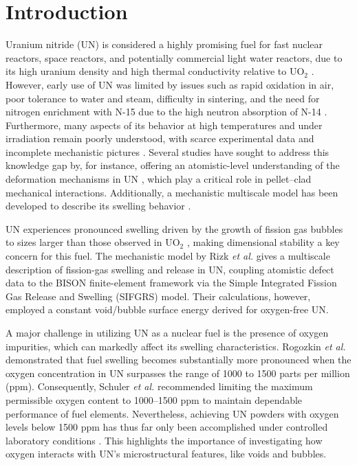 \documentclass[preprint,12pt,sort&compress]{elsarticle}
\newcommand{\?}{\stackrel{?}{=}}
\providecommand{\DIFaddtex}[1]{{\bf #1}} %
\providecommand{\DIFdeltex}[1]{} %
\providecommand{\DIFaddbegin}{\protect\color{blue}} %
\providecommand{\DIFaddend}{\protect\color{black}} %
\providecommand{\DIFdelbegin}{\protect\color{red}} %
\providecommand{\DIFdelend}{\protect\color{black}} %
\providecommand{\DIFadd}[1]{\texorpdfstring{\DIFaddtex{#1}}{#1}} %
\providecommand{\DIFdel}[1]{\texorpdfstring{\DIFdeltex{#1}}{}} %
\newcommand{\DIFscaledelfig}{0.5}
\newlength{\DIFdelgraphicswidth} %
\newlength{\DIFdelgraphicsheight} %
\newcommand{\DIFaddincludegraphics}[2][]{{\color{blue}\fbox{\DIFOincludegraphics[#1]{#2}}}} %
\newcommand{\DIFdelincludegraphics}[2][]{%
\sbox{\DIFdelgraphicsbox}{\DIFOincludegraphics[#1]{#2}}%
\settoboxwidth{\DIFdelgraphicswidth}{\DIFdelgraphicsbox} %
\settoboxtotalheight{\DIFdelgraphicsheight}{\DIFdelgraphicsbox} %
\scalebox{\DIFscaledelfig}{%
\parbox[b]{\DIFdelgraphicswidth}{\usebox{\DIFdelgraphicsbox}\\[-\baselineskip] \rule{\DIFdelgraphicswidth}{0em}}\llap{\resizebox{\DIFdelgraphicswidth}{\DIFdelgraphicsheight}{%
\setlength{\unitlength}{\DIFdelgraphicswidth}%
\begin{picture}(1,1)%
\thicklines\linethickness{2pt} %
{\color[rgb]{1,0,0}\put(0,0){\framebox(1,1){}}}%
{\color[rgb]{1,0,0}\put(0,0){\line( 1,1){1}}}%
{\color[rgb]{1,0,0}\put(0,1){\line(1,-1){1}}}%
\end{picture}%
}\hspace*{3pt}}} %
} %
\DeclareRobustCommand{\DIFaddbegin}{\DIFOaddbegin \let\includegraphics\DIFaddincludegraphics} %
\DeclareRobustCommand{\DIFaddend}{\DIFOaddend \let\includegraphics\DIFOincludegraphics} %
\DeclareRobustCommand{\DIFdelbegin}{\DIFOdelbegin \let\includegraphics\DIFdelincludegraphics} %
\DeclareRobustCommand{\DIFdelend}{\DIFOaddend \let\includegraphics\DIFOincludegraphics} %
\begin{document}
\newpage

\linenumbers

\section{Introduction}
\label{intro}

Uranium nitride (UN) is considered a highly promising fuel for fast nuclear reactors, space reactors, and potentially commercial light water reactors, due to its high uranium density and high thermal conductivity relative to UO$_2$ \cite{Wallenius2020, Uno2020}. However, early use of UN was limited by issues such as rapid oxidation in air, poor tolerance to water and steam, difficulty in sintering, and the need for nitrogen enrichment with N-15 due to the high neutron absorption of N-14 \cite{Wallenius2020, Uno2020}. Furthermore, many aspects of its behavior at high temperatures and under irradiation remain poorly understood, with scarce experimental data and incomplete mechanistic pictures \cite{Wallenius2020, Uno2020}. Several studies have sought to address this knowledge gap by, for instance, offering an atomistic-level understanding of the deformation mechanisms in UN \DIFdelbegin \DIFdel{\cite{AbdulHameed2024b, AbdulHameed2024c}}\DIFdelend \DIFaddbegin \DIFadd{\cite{AbdulHameed2024b, AbdulHameed2025}}\DIFaddend , which play a critical role in pellet–clad mechanical interactions. Additionally, a mechanistic multiscale model has been developed to describe its swelling behavior \cite{Rizk2025}.

UN experiences pronounced swelling driven by the growth of fission gas bubbles to sizes larger than those observed in UO$_2$ \cite{Ronchi1975, Ronchi1978, Rizk2025}, making dimensional stability a key concern for this fuel. The mechanistic model by Rizk \textit{et al.} \cite{Rizk2025} gives a multiscale description of fission-gas swelling and release in UN, coupling atomistic defect data to the BISON finite-element framework via the Simple Integrated Fission Gas Release and Swelling (SIFGRS) model. Their calculations, however, employed a constant void/bubble surface energy derived for oxygen-free UN.

A major challenge in utilizing UN as a nuclear fuel is the presence of oxygen impurities, which can markedly affect its swelling characteristics. Rogozkin \textit{et al.} \cite{Rogozkin2003} demonstrated that fuel swelling becomes substantially more pronounced when the oxygen concentration in UN surpasses the range of 1000 to 1500 parts per million (ppm). Consequently, Schuler \textit{et al.} \cite{Schuler2017} recommended limiting the maximum permissible oxygen content to 1000--1500 ppm to maintain dependable performance of fuel elements. Nevertheless, achieving UN powders with oxygen levels below 1500 ppm has thus far only been accomplished under controlled laboratory conditions \cite{Schuler2017}. This highlights the importance of investigating how oxygen interacts with UN's microstructural features, like voids and bubbles. 
\end{document}
